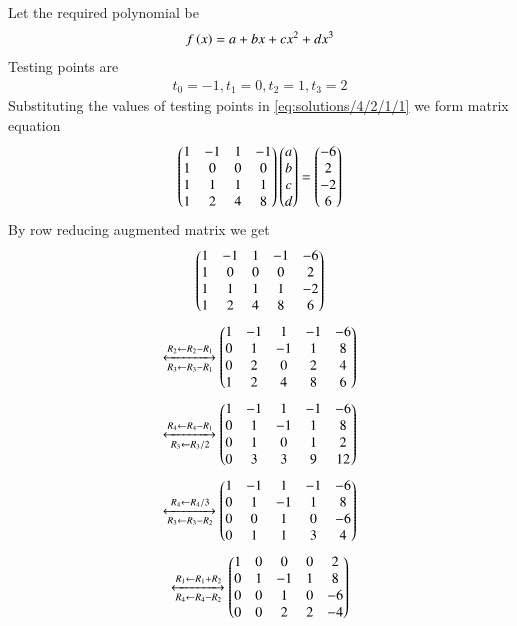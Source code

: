 Let the required polynomial be 
\begin{align}
    f\left(x\right)=a+bx+c x^{2}+d x^{3} \label{eq:solutions/4/2/1/1}
\end{align} 
Testing points are 
\begin{align}
    t_0=-1 , t_1=0 , t_2=1 , t_3=2 
\end{align}
Substituting the values of testing points in \eqref{eq:solutions/4/2/1/1} we form matrix equation 
\begin{align}
    \begin{pmatrix}1&-1&1&-1\\1&0&0&0\\1&1&1&1\\1&2&4&8\end{pmatrix}\begin{pmatrix}a\\b\\c\\d\end{pmatrix}=\begin{pmatrix}-6\\2\\-2\\6\end{pmatrix}
\end{align}
By row reducing augmented matrix we get
\begin{align}
   \begin{pmatrix}1&-1&1&-1&-6\\1&0&0&0&2\\1&1&1&1&-2\\1&2&4&8&6\end{pmatrix}
\end{align}
\begin{align}
\xleftrightarrow[R_3\leftarrow R_3-R_1]{R_2\leftarrow R_2-R_1}
\begin{pmatrix}1&-1&1&-1&-6\\0&1&-1&1&8\\0&2&0&2&4\\1&2&4&8&6\end{pmatrix}
\end{align}
\begin{align}
\xleftrightarrow[R_3\leftarrow R_3/2]{R_4\leftarrow R_4-R_1}
\begin{pmatrix}1&-1&1&-1&-6\\0&1&-1&1&8\\0&1&0&1&2\\0&3&3&9&12\end{pmatrix}
\end{align}
\begin{align}
\xleftrightarrow[R_3\leftarrow R_3-R_2]{R_4\leftarrow R_4/3}
\begin{pmatrix}1&-1&1&-1&-6\\0&1&-1&1&8\\0&0&1&0&-6\\0&1&1&3&4\end{pmatrix}
\end{align}
\begin{align}
\xleftrightarrow[R_4\leftarrow R_4-R_2]{R_1\leftarrow R_1+R_2}
\begin{pmatrix}1&0&0&0&2\\0&1&-1&1&8\\0&0&1&0&-6\\0&0&2&2&-4\end{pmatrix}
\end{align}

